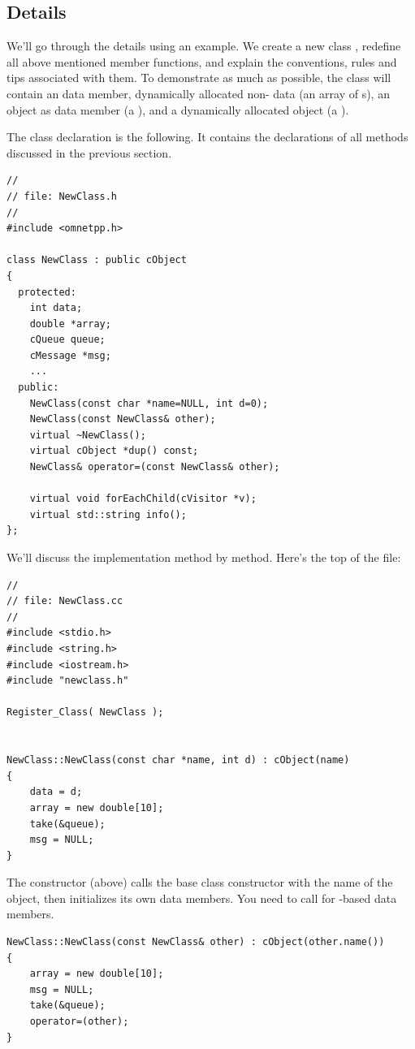 \subsection{Details}

We'll go through the details using an example. We create a new
class , redefine all above mentioned 
member functions, and explain the conventions, rules and tips
associated with them.
To demonstrate as much as possible, the class will contain
an  data member, dynamically allocated non- data
(an array of s),
an {\opp} object as data member (a ), and
a dynamically allocated {\opp} object (a ).

The class declaration is the following. It contains the declarations
of all methods discussed in the previous section.

\begin{verbatim}
//
// file: NewClass.h
//
#include <omnetpp.h>

class NewClass : public cObject
{
  protected:
    int data;
    double *array;
    cQueue queue;
    cMessage *msg;
    ...
  public:
    NewClass(const char *name=NULL, int d=0);
    NewClass(const NewClass& other);
    virtual ~NewClass();
    virtual cObject *dup() const;
    NewClass& operator=(const NewClass& other);

    virtual void forEachChild(cVisitor *v);
    virtual std::string info();
};
\end{verbatim}

We'll discuss the implementation method by method.
Here's the top of the  file:

\begin{verbatim}
//
// file: NewClass.cc
//
#include <stdio.h>
#include <string.h>
#include <iostream.h>
#include "newclass.h"

Register_Class( NewClass );


NewClass::NewClass(const char *name, int d) : cObject(name)
{
    data = d;
    array = new double[10];
    take(&queue);
    msg = NULL;
}
\end{verbatim}

The constructor (above) calls the base class constructor with
the name of the object, then initializes its own data members.
You need to call  for -based data members.


\begin{verbatim}
NewClass::NewClass(const NewClass& other) : cObject(other.name())
{
    array = new double[10];
    msg = NULL;
    take(&queue);
    operator=(other);
}
\end{verbatim}

